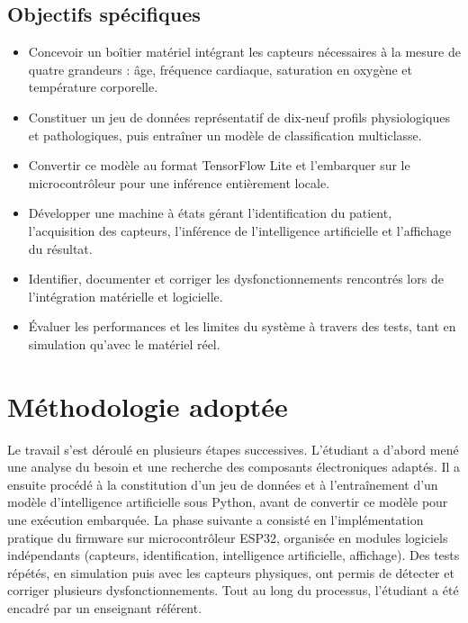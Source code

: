 \documentclass[12pt,a4paper]{report}
\begin{document}
\subsection{Objectifs spécifiques}
\begin{itemize}
    \item Concevoir un boîtier matériel intégrant les capteurs nécessaires à la mesure de quatre grandeurs : âge, fréquence cardiaque, saturation en oxygène et température corporelle.
    \item Constituer un jeu de données représentatif de dix-neuf profils physiologiques et pathologiques, puis entraîner un modèle de classification multiclasse.
    \item Convertir ce modèle au format TensorFlow Lite et l'embarquer sur le microcontrôleur pour une inférence entièrement locale.
    \item Développer une machine à états gérant l'identification du patient, l'acquisition des capteurs, l'inférence de l'intelligence artificielle et l'affichage du résultat.
    \item Identifier, documenter et corriger les dysfonctionnements rencontrés lors de l'intégration matérielle et logicielle.
    \item Évaluer les performances et les limites du système à travers des tests, tant en simulation qu'avec le matériel réel.
\end{itemize}

\section{Méthodologie adoptée}
Le travail s'est déroulé en plusieurs étapes successives. L'étudiant a d'abord mené une analyse du besoin et une recherche des composants électroniques adaptés. Il a ensuite procédé à la constitution d'un jeu de données et à l'entraînement d'un modèle d'intelligence artificielle sous Python, avant de convertir ce modèle pour une exécution embarquée. La phase suivante a consisté en l'implémentation pratique du firmware sur microcontrôleur ESP32, organisée en modules logiciels indépendants (capteurs, identification, intelligence artificielle, affichage). Des tests répétés, en simulation puis avec les capteurs physiques, ont permis de détecter et corriger plusieurs dysfonctionnements. Tout au long du processus, l'étudiant a été encadré par un enseignant référent.
\end{document}
